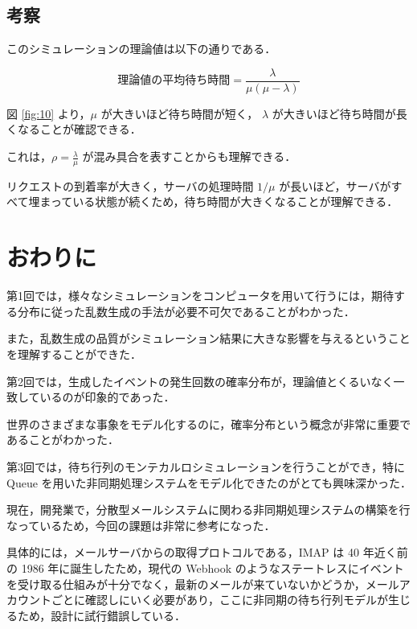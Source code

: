 \documentclass[fleqn, a4paper. 12pt]{jsarticle}
\begin{document}
  
      \subsection*{考察}

        このシミュレーションの理論値は以下の通りである．

        \begin{equation}
          \text{理論値の平均待ち時間} = \frac{\lambda}{\mu (\mu - \lambda)}
        \end{equation}
  
        図 \ref{fig:10} より，$\mu$ が大きいほど待ち時間が短く， $\lambda$ が大きいほど待ち時間が長くなることが確認できる．

        これは，$\rho=\frac{\lambda}{\mu}$ が混み具合を表すことからも理解できる．
  
        リクエストの到着率が大きく，サーバの処理時間 $1/\mu$ が長いほど，サーバがすべて埋まっている状態が続くため，待ち時間が大きくなることが理解できる．

  \newpage

  \section*{おわりに}

    第1回では，様々なシミュレーションをコンピュータを用いて行うには，期待する分布に従った乱数生成の手法が必要不可欠であることがわかった．
    
    また，乱数生成の品質がシミュレーション結果に大きな影響を与えるということを理解することができた．

    \quad

    第2回では，生成したイベントの発生回数の確率分布が，理論値とくるいなく一致しているのが印象的であった．

    世界のさまざまな事象をモデル化するのに，確率分布という概念が非常に重要であることがわかった．

    \quad

    第3回では，待ち行列のモンテカルロシミュレーションを行うことができ，特に Queue を用いた非同期処理システムをモデル化できたのがとても興味深かった．

    現在，開発業で，分散型メールシステムに関わる非同期処理システムの構築を行なっているため，今回の課題は非常に参考になった．

    具体的には，メールサーバからの取得プロトコルである，IMAP は 40 年近く前の 1986 年に誕生したため，現代の Webhook のようなステートレスにイベントを受け取る仕組みが十分でなく，最新のメールが来ていないかどうか，メールアカウントごとに確認しにいく必要があり，ここに非同期の待ち行列モデルが生じるため，設計に試行錯誤している．
\end{document}
